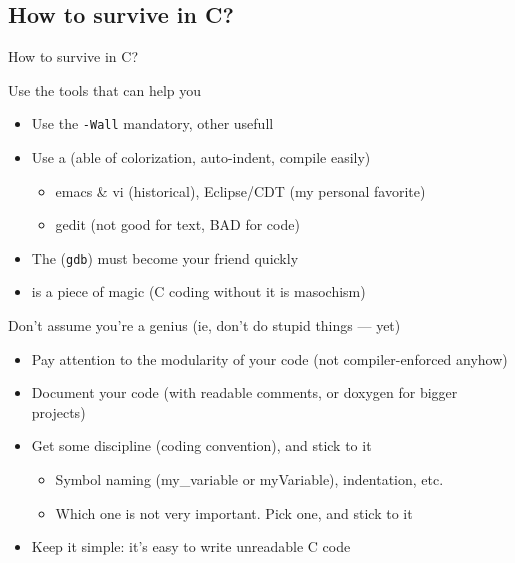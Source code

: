 \subsection{How to survive in C?}
\begin{frame}{How to survive in C?}
  \begin{block}{Use the tools that can help you}
    \begin{itemize}
    \item Use the  \texttt{-Wall} mandatory,
      other usefull
    \item Use a  (able of colorization, auto-indent,
      compile easily)
      \begin{itemize}
      \item {} emacs \& vi (historical),
        Eclipse{\small/CDT} (my personal favorite)
      \item {} gedit (not good for text, BAD for code)
      \end{itemize}
    \item The  (\texttt{gdb}) must become your friend
      quickly
    \item {} is a piece of magic (C coding without it is
      masochism)
    \end{itemize}
  \end{block}

  \begin{block}{Don't assume you're a genius (ie, don't do stupid things ---
      yet)}
    \begin{itemize}
    \item Pay attention to the modularity of your code (not compiler-enforced anyhow)
    \item Document your code (with readable comments, or doxygen for bigger
      projects) 
    \item Get some discipline (coding convention), and stick to it
      \begin{itemize}
      \item Symbol naming (my\_variable or myVariable), indentation, etc.
      \item Which one is not very important. Pick one, and stick to it
      \end{itemize}
    \item Keep it simple: it's easy to write unreadable C code
    \end{itemize}
  \end{block}
\end{frame}
